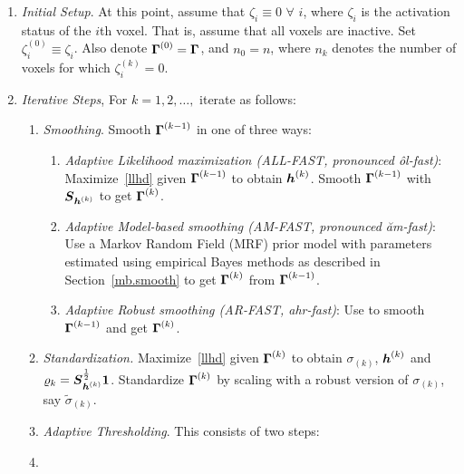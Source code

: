 \begin{enumerate}
\item {\em Initial Setup}. At this point, assume that $\zeta_i
  \equiv 0$ $\forall$ $i$, where $\zeta_i$ is the activation status of the $i$th
  voxel. That is, assume that all voxels are inactive. Set
  $\zeta_i^{(0)} \equiv \zeta_i$. Also denote $\boldsymbol{\Gamma}^{(0)} =
  \boldsymbol{\Gamma}$, and $n_0=n$, where $n_k$ denotes the number of voxels for which
  $\zeta_i^{(k)} = 0$.  
\item {\em Iterative Steps}, \label{step2}
  For $k\!=\!1,2,\ldots,$ iterate as follows:
  \begin{enumerate}
  \item 
    {\em Smoothing}. Smooth  $\boldsymbol{\Gamma}^{(k-1)}$ in one of three
    ways:
    \begin{enumerate}
    \item\label{ALL-FAST} {\em Adaptive Likelihood maximization
        (ALL-FAST, pronounced {\em\^ol-fast})}:
    Maximize~\eqref{llhd} given $\boldsymbol{\Gamma}^{(k-1)}$     to obtain 
    ${\boldsymbol{h}}^{(k)}$. Smooth $\boldsymbol{\Gamma}^{(k-1)}$ with
    $\boldsymbol{S}_{{\boldsymbol{h}}^{(k)}}$ to get $\boldsymbol{\Gamma}^{(k)}$. 
  \item\label{AM-FAST} {\em Adaptive Model-based smoothing
      (AM-FAST, pronounced {\em\u{a}m-fast})}:
    Use a Markov Random Field (MRF) prior model with parameters
    estimated using empirical Bayes methods as described in
    Section~\ref{mb.smooth} to get $\boldsymbol{\Gamma}^{(k)}$ from
    $\boldsymbol{\Gamma}^{(k-1)}$. 
    \item\label{AR-FAST} {\em Adaptive Robust smoothing (AR-FAST,
        {\em ahr-fast})}: Use \citep{garcia10} to smooth
      $\boldsymbol{\Gamma}^{(k-1)}$ and get    $\boldsymbol{\Gamma}^{(k)}$.
    \end{enumerate}
  \item\label{std} {\em Standardization.} Maximize~\eqref{llhd} given
    $\boldsymbol{\Gamma}^{(k)}$ to obtain $\sigma_{(k)}$, ${\boldsymbol{h}}^{(k)}$ and $\varrho_k=
    {\boldsymbol{S}}_{{\boldsymbol{h}}^{(k)}}^{\frac12}{\boldsymbol{1}}$. Standardize
      $\boldsymbol{\Gamma}^{(k)}$ by scaling with a robust version of
      $\sigma_{(k)}$, say $\tilde\sigma_{(k)}$.
\item {\em Adaptive Thresholding}. This consists of two steps:
  \ben
\item

\end{enumerate}
\end{enumerate}
